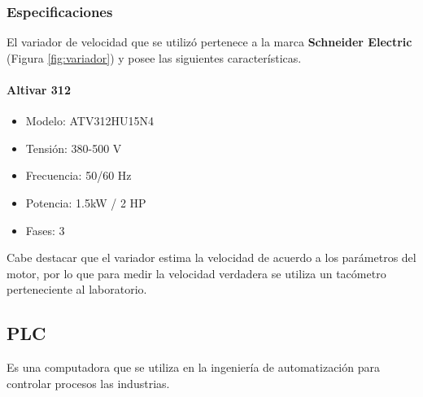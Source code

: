 \subsubsection{Especificaciones}
El variador de velocidad que se utilizó pertenece a la marca \textbf{Schneider Electric} (Figura \ref{fig:variador}) y posee las siguientes características.
\paragraph*{Altivar 312}
\begin{minipage}[t]{.5\textwidth}
	\begin{itemize}
		\item 	Modelo: ATV312HU15N4
		\item   Tensión: 380-500 V
		\item 	Frecuencia: 50/60 Hz
		\item 	Potencia: 1.5kW / 2 HP
		\item 	Fases: 3
	\end{itemize}
\end{minipage}
\begin{minipage}[t]{.5\textwidth}
	\centering{}
	\label{fig:variador}
\end{minipage}


Cabe destacar que el variador estima la velocidad de acuerdo a los parámetros del motor, por lo que para medir la velocidad verdadera se utiliza un tacómetro perteneciente al laboratorio.


\subsection{PLC}
\begin{tcolorbox}[colback=blue!5!white,colframe=blue!75!black,title=PLC]
	Es una computadora que se utiliza en la ingeniería de automatización para controlar procesos las industrias.
\end{tcolorbox}

